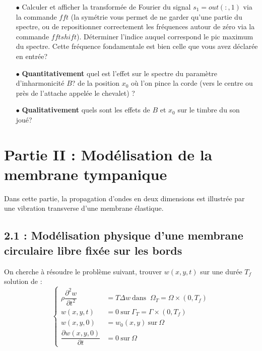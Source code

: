\documentclass[a4,12pt]{article}
\begin{document}
	    \begin{itemize}
	      \item[$\bullet$] Calculer et afficher la transformée de Fourier du signal $s_1=out(:,1)$ via la commande $fft$ 	(la symétrie vous permet de ne garder qu'une partie du spectre, ou de repositionner correctement les 		fréquences autour de zéro via la commande $fftshift$). Déterminer l'indice auquel correspond le pic maximum 	du spectre. Cette fréquence fondamentale est bien celle que vous avez déclarée en entrée?\\ 
	      \item[$\bullet$] \textbf{Quantitativement} quel est l'effet sur le spectre du paramètre d'inharmonicité $B$? de 	la position $x_0$ où l'on pince la corde (vers le centre ou près de l'attache appelée le chevalet) ? \\ 
	      \item[$\bullet$] \textbf{Qualitativement} quels sont les effets de $B$ et $x_0$ sur le timbre du son joué?\end{itemize} 


	    \newpage


	    \section*{Partie II : Modélisation de la membrane tympanique}

	    Dans cette partie, la propagation d'ondes en deux dimensions est illustrée par une vibration transverse d'une membrane élastique.

	    \subsection*{2.1 : Modélisation physique d'une membrane circulaire libre fixée sur les bords}

	    On cherche à résoudre le problème suivant, trouver $w(x,y,t)$ sur une durée $T_f$ solution de :
	    \begin{equation}
	      \left\{
		\begin{array}{rl}
		  \rho \dfrac{\partial^2 w}{\partial t^2} & =  T \Delta w ~\textrm{dans } ~ \Omega_T = \Omega \times (0,T_f)\\ 
		  w(x,y,t)& =  0 ~\textrm{sur} ~ \Gamma_T=\Gamma \times (0,T_f)\\
		  w(x,y,0)& = w_0(x,y) ~ \textrm{sur} ~\Omega \\
		  \dfrac{\partial w(x,y,0)}{\partial t} & = 0 ~\textrm{sur} ~\Omega 
		\end{array}
		\right.
		\label{eq:membranemodel}
	      \end{equation}
\end{document}
